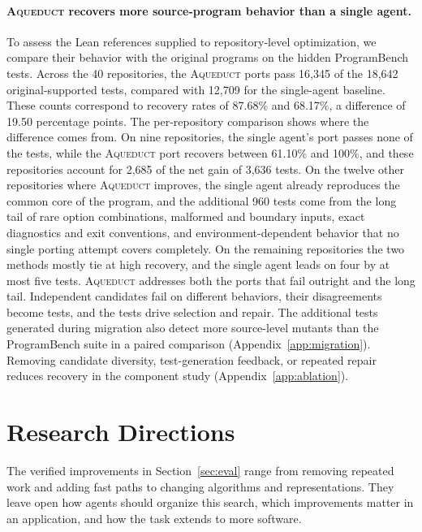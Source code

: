 \documentclass{article}
\newcommand{\aqueduct}{\textsc{Aqueduct}\xspace}
\begin{document}
\paragraph{\aqueduct{} recovers more source-program behavior than a single agent.}
To assess the Lean references supplied to repository-level optimization, we compare their behavior with the original programs on the hidden ProgramBench tests.
Across the 40 repositories, the \aqueduct{} ports pass 16,345 of the 18,642 original-supported tests, compared with 12,709 for the single-agent baseline.
These counts correspond to recovery rates of 87.68\% and 68.17\%, a difference of 19.50 percentage points.
The per-repository comparison shows where the difference comes from.
On nine repositories, the single agent's port passes none of the tests, while the \aqueduct{} port recovers between 61.10\% and 100\%, and these repositories account for 2,685 of the net gain of 3,636 tests.
On the twelve other repositories where \aqueduct{} improves, the single agent already reproduces the common core of the program, and the additional 960 tests come from the long tail of rare option combinations, malformed and boundary inputs, exact diagnostics and exit conventions, and environment-dependent behavior that no single porting attempt covers completely.
On the remaining repositories the two methods mostly tie at high recovery, and the single agent leads on four by at most five tests.
\aqueduct{} addresses both the ports that fail outright and the long tail.
Independent candidates fail on different behaviors, their disagreements become tests, and the tests drive selection and repair.
The additional tests generated during migration also detect more source-level mutants than the ProgramBench suite in a paired comparison (Appendix~\ref{app:migration}).
Removing candidate diversity, test-generation feedback, or repeated repair reduces recovery in the component study (Appendix~\ref{app:ablation}).

\section{Research Directions}
\label{sec:future}

The verified improvements in Section~\ref{sec:eval} range from removing repeated work and adding fast paths to changing algorithms and representations.
They leave open how agents should organize this search, which improvements matter in an application, and how the task extends to more software.
\end{document}
